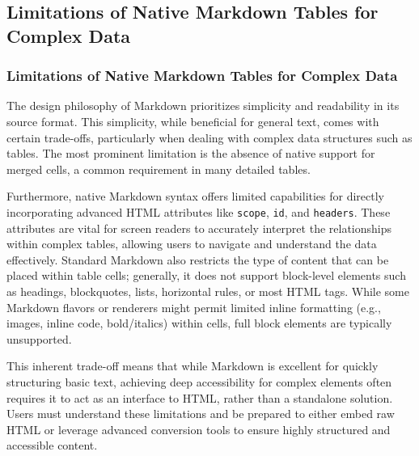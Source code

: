 \subsection{Limitations of Native Markdown Tables for Complex Data}
\subsubsection{Limitations of Native Markdown Tables for Complex Data}

The design philosophy of Markdown prioritizes simplicity and readability in its source format. This simplicity, while beneficial for general text, comes with certain trade-offs, particularly when dealing with complex data structures such as tables. The most prominent limitation is the absence of native support for merged cells, a common requirement in many detailed tables. \cite{DocsToMarkdown}

Furthermore, native Markdown syntax offers limited capabilities for directly incorporating advanced HTML attributes like \texttt{scope}, \texttt{id}, and \texttt{headers}. \cite{MDNTableAccess} These attributes are vital for screen readers to accurately interpret the relationships within complex tables, allowing users to navigate and understand the data effectively. \cite{MDNTableAccess} Standard Markdown also restricts the type of content that can be placed within table cells; generally, it does not support block-level elements such as headings, blockquotes, lists, horizontal rules, or most HTML tags. \cite{MarkdownGuideExtended} While some Markdown flavors or renderers might permit limited inline formatting (e.g., images, inline code, bold/italics) within cells, full block elements are typically unsupported. \cite{DocsToMarkdown,MarkdownGuideExtended}

This inherent trade-off means that while Markdown is excellent for quickly structuring basic text, achieving deep accessibility for complex elements often requires it to act as an interface to HTML, rather than a standalone solution. Users must understand these limitations and be prepared to either embed raw HTML or leverage advanced conversion tools to ensure highly structured and accessible content.

